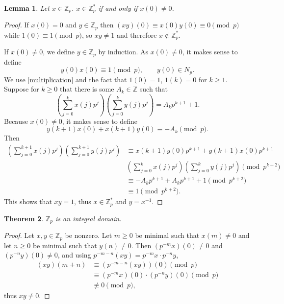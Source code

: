 \documentclass{article}
\newtheorem{theorem}{Theorem}
\newtheorem{lemma}[theorem]{Lemma}
\theoremstyle{definition}
\begin{document}
\begin{lemma}
Let $x \in \mathbb{Z}_p$. $x \in \mathbb{Z}_p^*$ if and only if $x(0) \neq 0$. 
\label{invertible}
\end{lemma}
\begin{proof}
If $x(0)=0$ and $y \in \mathbb{Z}_p$ then $(xy)(0) \equiv x(0) y(0)  \equiv 0 \pmod{p}$ while
$1(0) \equiv 1 \pmod{p}$, so $xy \neq 1$ and therefore $x \not \in \mathbb{Z}_p^*$.

If $x(0) \neq 0$, we define $y \in \mathbb{Z}_p$ by induction. As $x(0) \neq 0$, it makes sense to define 
\[
y(0) x(0) \equiv 1 \pmod{p},\qquad y(0) \in N_p.
\]
We use \eqref{multiplication} and the fact that $1(0)=1$, $1(k)=0$ for $k \geq 1$. Suppose for $k \geq 0$ that 
there is some $A_k \in \mathbb{Z}$ such that
\[
 \left( \sum_{j=0}^k x(j) p^j \right) \left( \sum_{j=0}^k y(j) p^j\right) = A_k p^{k+1} + 1.
\]
Because $x(0) \neq 0$, it makes sense to define
\[
y(k+1)x(0) + x(k+1)y(0) \equiv -A_k \pmod{p}.
\]
Then
\begin{align*}
 \left( \sum_{j=0}^{k+1} x(j) p^j \right) \left( \sum_{j=0}^{k+1} y(j) p^j\right) &\equiv 
x(k+1)y(0)p^{k+1}+y(k+1)x(0)p^{k+1}\\
& \left( \sum_{j=0}^{k} x(j) p^j \right) \left( \sum_{j=0}^{k} y(j) p^j\right) \pmod{p^{k+2}}\\
&\equiv -A_k p^{k+1}+ A_k p^{k+1} + 1 \pmod{p^{k+2}}\\
&\equiv 1 \pmod{p^{k+2}}.
\end{align*}
This shows that $xy = 1$, thus $x \in \mathbb{Z}_p^*$ and $y = x^{-1}$.
\end{proof}



\begin{theorem}
$\mathbb{Z}_p$ is an integral domain.
\end{theorem}
\begin{proof}
Let $x,y \in \mathbb{Z}_p$ be nonzero. Let $m \geq 0$ be minimal such that $x(m) \neq 0$ and let $n \geq 0$ be minimal such that $y(n) \neq 0$.
Then $(p^{-m}x)(0) \neq 0$ and $(p^{-n}y)(0) \neq 0$, and using
$p^{-m-n} (xy) = p^{-m} x \cdot p^{-n} y$,
\begin{align*}
(xy)(m+n) &\equiv 
(p^{-m-n} (xy))(0) \pmod{p}\\
&\equiv (p^{-m} x)(0)  \cdot (p^{-n} y)(0) \pmod{p}\\
&\not \equiv 0 \pmod{p},
\end{align*}
thus $xy \neq 0$.
\end{proof}
\end{document}
